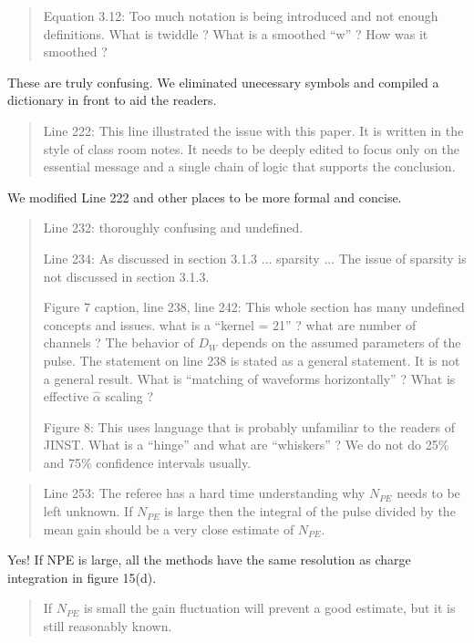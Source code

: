 \documentclass[12pt]{article}
\begin{document}
\begin{quote}
Equation 3.12: Too much notation is being introduced and not enough definitions. What is twiddle ? What is a smoothed ``w'' ? How was it smoothed ?
\end{quote}

These are truly confusing. We eliminated unecessary symbols and compiled a dictionary in front to aid the readers. 

\begin{quote}
Line 222: This line illustrated the issue with this paper. It is written in the style of class room notes. It needs to be deeply edited to focus only on the essential message and a single chain of logic that supports the conclusion.
\end{quote}

We modified Line 222 and other places to be more formal and concise.

\begin{quote}
Line 232: thoroughly confusing and undefined.

Line 234: As discussed in section 3.1.3 ... sparsity ... The issue of sparsity is not discussed in section 3.1.3.

Figure 7 caption, line 238, line 242: This whole section has many undefined concepts and issues. what is a ``kernel = 21'' ? what are number of channels ? The behavior of $D_W$ depends on the assumed parameters of the pulse. The statement on line 238 is stated as a general statement. It is not a general result. What is ``matching of waveforms horizontally'' ? What is effective $\hat{\alpha}$ scaling ?

Figure 8: This uses language that is probably unfamiliar to the readers of JINST. What is a ``hinge'' and what are ``whiskers'' ? We do not do 25\% and 75\% confidence intervals usually.
\end{quote}

\begin{quote}
Line 253: The referee has a hard time understanding why $N_{PE}$ needs to be left unknown. If $N_{PE}$ is large then the integral of the pulse divided by the mean gain should be a very close estimate of $N_{PE}$. 
\end{quote}

Yes! If NPE is large, all the methods have the same resolution as charge integration in figure 15(d).

\begin{quote}
If $N_{PE}$ is small the gain fluctuation will prevent a good estimate, but it is still reasonably known.
\end{quote}
\end{document}
